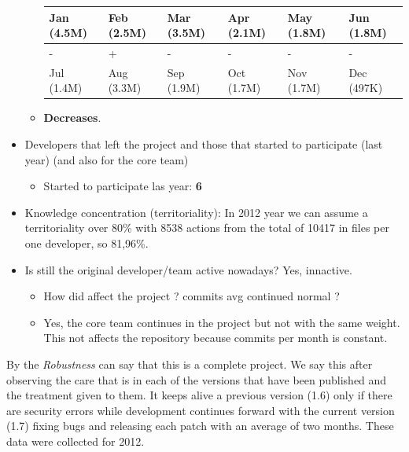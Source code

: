\documentclass[11pt]{scrartcl}
\begin{document}
\begin{itemize}
\begin{itemize}
            \begin{tabular}{|l|l|l|l|l|l|}
                \hline
        	    Jan (4.5M) & Feb (2.5M) & Mar (3.5M) & Apr (2.1M) & May (1.8M) & Jun (1.8M)\\
        	    \hline
        	    - & + & - & - & - & -\\
                \hline
                Jul (1.4M) & Aug (3.3M) & Sep (1.9M) & Oct (1.7M) & Nov (1.7M) & Dec (497K)\\
                \hline
            \end{tabular}
        \item \textbf{Decreases}.
    \end{itemize}
    \item Developers that left the project and those that started to participate (last year) (and also for the core team)
    \begin{itemize}
        \item Started to participate las year: \textbf{6}
    \end{itemize}
	    \item Knowledge concentration (territoriality): In 2012 year we can assume a territoriality over 80\% with 8538 actions from the total of 10417 in files per one developer, so 81,96\%.
    \item Is still the original developer/team active nowadays? Yes, innactive.
    \begin{itemize}
        \item How did affect the project ? commits avg continued normal ?
        \item Yes, the core team continues in the project but not with the same weight. This not affects the repository because commits per month is constant.
    \end{itemize}
\end{itemize}

\par By the \emph{Robustness} can say that this is a complete project. We say this after observing the care that is in each of the versions that have been published and the treatment given to them. It keeps alive a previous version (1.6) only if there are security errors while development continues forward with the current version (1.7) fixing bugs and releasing each patch with an average of two months. These data were collected for 2012.
\end{document}
